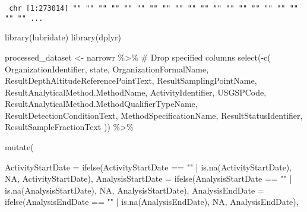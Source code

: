 \documentclass[
  12pt,
]{article}
\newenvironment{Shaded}{\begin{snugshade}}{\end{snugshade}}
\newcommand{\AttributeTok}[1]{\textcolor[rgb]{0.40,0.45,0.13}{#1}}
\newcommand{\CommentTok}[1]{\textcolor[rgb]{0.37,0.37,0.37}{#1}}
\newcommand{\ConstantTok}[1]{\textcolor[rgb]{0.56,0.35,0.01}{#1}}
\newcommand{\FunctionTok}[1]{\textcolor[rgb]{0.28,0.35,0.67}{#1}}
\newcommand{\NormalTok}[1]{\textcolor[rgb]{0.00,0.23,0.31}{#1}}
\newcommand{\OtherTok}[1]{\textcolor[rgb]{0.00,0.23,0.31}{#1}}
\newcommand{\SpecialCharTok}[1]{\textcolor[rgb]{0.37,0.37,0.37}{#1}}
\newcommand{\StringTok}[1]{\textcolor[rgb]{0.13,0.47,0.30}{#1}}
\begin{document}
\begin{Shaded}
\end{Shaded}

\begin{verbatim}
 chr [1:273014] "" "" "" "" "" "" "" "" "" "" "" "" "" "" "" "" "" "" "" "" ...
\end{verbatim}

\begin{Shaded}
\begin{Highlighting}[]
\FunctionTok{library}\NormalTok{(lubridate)}
\FunctionTok{library}\NormalTok{(dplyr)}

\NormalTok{processed\_dataset }\OtherTok{\textless{}{-}}\NormalTok{ narrowr }\SpecialCharTok{\%\textgreater{}\%}
  \CommentTok{\# Drop specified columns}
  \FunctionTok{select}\NormalTok{(}\SpecialCharTok{{-}}\FunctionTok{c}\NormalTok{(}
\NormalTok{    OrganizationIdentifier, state, OrganizationFormalName, }
\NormalTok{    ResultDepthAltitudeReferencePointText, }
\NormalTok{    ResultSamplingPointName, }
\NormalTok{    ResultAnalyticalMethod.MethodName, }
\NormalTok{    ActivityIdentifier, USGSPCode, }
\NormalTok{    ResultAnalyticalMethod.MethodQualifierTypeName,}
\NormalTok{    ResultDetectionConditionText,}
\NormalTok{    MethodSpecificationName, ResultStatusIdentifier,}
\NormalTok{    ResultSampleFractionText}
\NormalTok{  )) }\SpecialCharTok{\%\textgreater{}\%}
  
   
  \FunctionTok{mutate}\NormalTok{(}
     
    \AttributeTok{ActivityStartDate =} \FunctionTok{ifelse}\NormalTok{(ActivityStartDate }\SpecialCharTok{==} \StringTok{""} \SpecialCharTok{|} 
                                 \FunctionTok{is.na}\NormalTok{(ActivityStartDate), }\ConstantTok{NA}\NormalTok{,}
\NormalTok{                               ActivityStartDate),}
    \AttributeTok{AnalysisStartDate =} \FunctionTok{ifelse}\NormalTok{(AnalysisStartDate }\SpecialCharTok{==} \StringTok{""} \SpecialCharTok{|} 
                                 \FunctionTok{is.na}\NormalTok{(AnalysisStartDate), }\ConstantTok{NA}\NormalTok{,}
\NormalTok{                               AnalysisStartDate),}
    \AttributeTok{AnalysisEndDate =} \FunctionTok{ifelse}\NormalTok{(AnalysisEndDate }\SpecialCharTok{==} \StringTok{""} \SpecialCharTok{|} 
                               \FunctionTok{is.na}\NormalTok{(AnalysisEndDate), }
                             \ConstantTok{NA}\NormalTok{, AnalysisEndDate),}
    

\end{Highlighting}
\end{Shaded}
\end{document}
